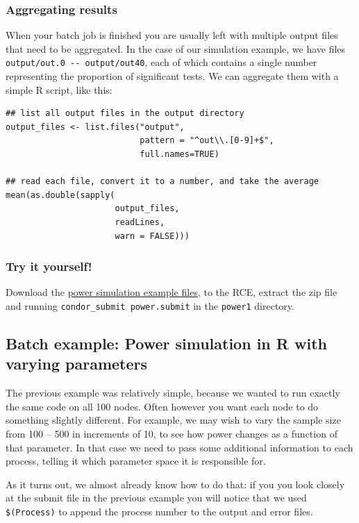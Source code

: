 \documentclass[11pt]{article}
\begin{document}
\subsubsection{Aggregating results}
\label{sec-7-3-4}
When your batch job is finished you are usually left with multiple output files that need to be aggregated. In the case of our simulation example, we have files \texttt{output/out.0 -{}- output/out40}, each of which contains a single number representing the proportion of significant tests. We can aggregate them with a simple R script, like this:
\begin{verbatim}
## list all output files in the output directory
output_files <- list.files("output",
                           pattern = "^out\\.[0-9]+$",
                           full.names=TRUE)

## read each file, convert it to a number, and take the average
mean(as.double(sapply(
                      output_files,
                      readLines,
                      warn = FALSE)))
\end{verbatim}

\subsubsection{Try it yourself!}
\label{sec-7-3-5}
Download the \href{examples/power1.zip}{power simulation example files}, to the RCE, extract the zip file and running \texttt{condor\_submit power.submit} in the \texttt{power1} directory.

\subsection{Batch example: Power simulation in R with varying parameters}
\label{sec-7-4}
The previous example was relatively simple, because we wanted to run exactly the same code on all 100 nodes. Often however you want each node to do something slightly different. For example, we may wish to vary the sample size from 100 -- 500 in increments of 10, to see how power changes as a function of that parameter. In that case we need to pass some additional information to each process, telling it which parameter space it is responsible for. 

As it turns out, we almost already know how to do that: if you you look closely at the submit file in the previous example you will notice that we used \texttt{\$(Process)} to append the process number to the output and error files. 
\end{document}
